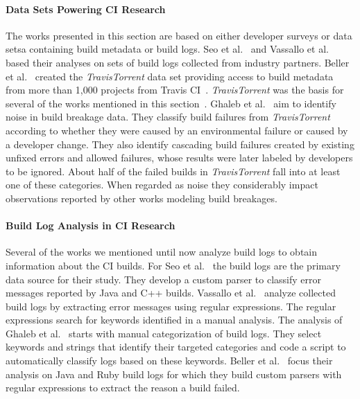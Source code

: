 \documentclass[\myrootdir/main.tex]{subfiles}
\begin{document}
\paragraph{Data Sets Powering CI Research}
The works presented in this section are based on either developer surveys or data setsa containing build metadata or build logs.
Seo et al.~\cite{seo2014programmers} and Vassallo et al.~\cite{vassallo2017a-tale} based their analyses on sets of build logs collected from industry partners.
Beller et al.~\cite{beller2017travistorrent} created the \emph{TravisTorrent} data set providing access to build metadata from more than 1,000 projects from Travis CI~\cite{travisci2019webpage}.
\emph{TravisTorrent} was the basis for several of the works mentioned in this section~\cite{rausch2017empirical,zampetti2017open,vassallo2017a-tale,beller2017oops}.
Ghaleb et al.~\cite{ghaleb2019studying} aim to identify noise in build breakage data.
They classify build failures from \emph{TravisTorrent} according to whether they were caused by an environmental failure or caused by a developer change.
They also identify cascading build failures created by existing unfixed errors and allowed failures, whose results were later labeled by developers to be ignored.
About half of the failed builds in \emph{TravisTorrent} fall into at least one of these categories.
When regarded as noise they considerably impact observations reported by other works modeling build breakages.

\paragraph{Build Log Analysis in CI Research}
Several of the works we mentioned until now analyze build logs to obtain information about the CI builds. 
For Seo et al.~\cite{seo2014programmers} the build logs are the primary data source for their study.
They develop a custom parser to classify error messages reported by Java and C++ builds. 
Vassallo et al.~\cite{vassallo2017a-tale} analyze collected build logs by extracting error messages using regular expressions.
The regular expressions search for keywords identified in a manual analysis.
The analysis of Ghaleb et al.~\cite{ghaleb2019studying} starts with manual categorization of build logs.
They select keywords and strings that identify their targeted categories and code a script to automatically classify logs based on these keywords.
Beller et al.~\cite{beller2017oops} focus their analysis on Java and Ruby build logs for which they build custom parsers with regular expressions to extract the reason a build failed.
\end{document}
